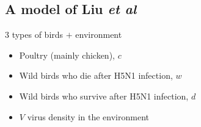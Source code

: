 \documentclass[aspectratio=43]{beamer}
\begin{document}
\subsection{A model of Liu \emph{et al}}

\begin{frame}{3 types of birds $+$ environment}
  \begin{itemize}
    \item Poultry (mainly chicken), $c$
    \item Wild birds who die after H5N1 infection, $w$
    \item Wild birds who survive after H5N1 infection, $d$
    \item $V$ virus density in the environment
  \end{itemize}
\end{frame}
\end{document}

